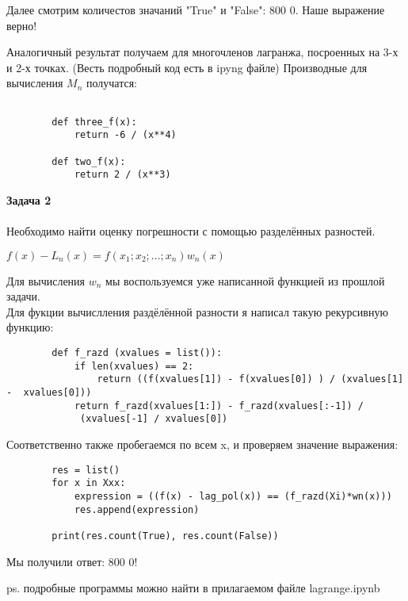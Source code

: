 \documentclass[letterpaper,12pt]{article}
\begin{document}
    Далее смотрим количестов значаний "True" и "False":
    800 0. Наше выражение верно!

    Аналогичный результат получаем для 
    многочленов лагранжа, посроенных на 3-х и 2-х
    точках. (Весть подробный код есть в ipyng файле)
    \clearpage
    Производные для вычисления $M_n$ получатся:

    \begin{lstlisting}
        
        def three_f(x):
            return -6 / (x**4)

        def two_f(x):
            return 2 / (x**3)

    \end{lstlisting}

    \textbf{Задача 2}
    \\~\\
    Необходимо найти оценку погрешности с 
    помощью разделённых разностей.

    \begin{center}

        $f(x) - L_n(x) = f(x_1; x_2; ... 
        ;x_n) w_n(x)$

    \end{center}

    Для вычисления $w_n$ мы воспользуемся 
    уже написанной функцией из прошлой задачи.
    \\
    Для фукции вычислления раздёлённой разности 
    я написал такую рекурсивную функцию:

    \begin{lstlisting}
        def f_razd (xvalues = list()):
            if len(xvalues) == 2:
                return ((f(xvalues[1]) - f(xvalues[0]) ) / (xvalues[1] -  xvalues[0])) 
            return f_razd(xvalues[1:]) - f_razd(xvalues[:-1]) /
             (xvalues[-1] / xvalues[0])
    \end{lstlisting}

    Соответственно также пробегаемся по всем x,
    и проверяем значение выражения:

    \begin{lstlisting}
        res = list()
        for x in Xxx:
            expression = ((f(x) - lag_pol(x)) == (f_razd(Xi)*wn(x)))
            res.append(expression)

        print(res.count(True), res.count(False))
    \end{lstlisting}

    Мы получили ответ: 800 0!

    \begin{flushright}
        ps. подробные программы можно 
        найти в прилагаемом файле lagrange.ipynb
    \end{flushright}
\end{document}

